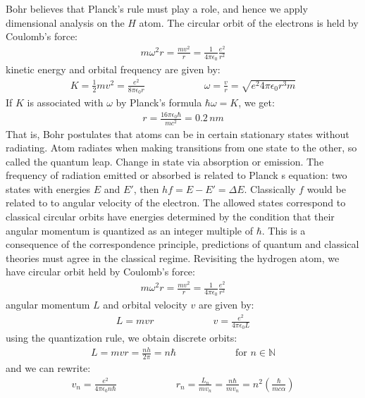 \documentclass[11pt]{article}
\theoremstyle{break}
\theoremstyle{break}
\newcommand{\N}{\mathbb{N}}
\begin{document}
Bohr believes that Planck's rule must play a role, and hence we apply dimensional analysis on the $H$ atom. The circular orbit of the electrons is held by Coulomb's force:
\begin{align*}
m\omega^2 r  =\frac{mv^2}{r} = \frac{1}{4\pi \epsilon_0}\frac{e^2}{r^2}
\end{align*}
kinetic energy and orbital frequency are given by:
\begin{align*}
K = \frac{1}{2}mv^2 = \frac{e^2}{8\pi \epsilon_0 r} \qquad\qquad\qquad \omega = \frac{v}{r} = \sqrt{e^2	4\pi \epsilon_0 r^3 m}
\end{align*}
If $K$ is associated with $\omega$ by Planck's formula $\hbar	\omega = K$, we get:
\begin{align*}
r = \frac{16\pi \epsilon_0 \hbar}{mc^2} = 0.2\, nm
\end{align*}
That is, Bohr postulates that atoms can be in certain stationary states without radiating. Atom radiates when making transitions from one state to the other, so called the quantum leap. Change in state via absorption or emission. The frequency of radiation emitted or absorbed is related to Planck s equation: two states with energies $E$ and $E'$, then $hf = E - E'=\Delta E$. Classically $f$ would be related to to angular velocity of the electron. The allowed  states correspond  to  classical  circular  orbits  have  energies  determined  by  the condition that their angular momentum is quantized as an integer multiple of $\hbar$. This is a consequence of the correspondence principle, predictions of quantum and classical theories must agree in the classical regime. Revisiting the hydrogen atom, we have circular orbit held by Coulomb's force:
\begin{align*}
m\omega^2 r  =\frac{mv^2}{r} = \frac{1}{4\pi \epsilon_0}\frac{e^2}{r^2}
\end{align*}
angular momentum $L$ and orbital velocity $v$ are given by:
\begin{align*}
L = mvr \qquad\qquad \qquad v=\frac{e^2}{4\pi \epsilon_0 L}
\end{align*}
using the quantization rule, we obtain discrete orbits:
\begin{align*}
L = mvr = \frac{nh}{2\pi} = n\hbar  \qquad\qquad\qquad \text{for }n \in \N
\end{align*}
and we can rewrite:
\begin{align*}
v_n = \frac{e^2}{4\pi \epsilon_0 n \hbar} \qquad\qquad\qquad r_n = \frac{L_n}{mv_n} = \frac{n\hbar}{mv_n} = n^2 \left( \frac{\hbar}{mc \alpha}\right)
\end{align*}
\end{document}
